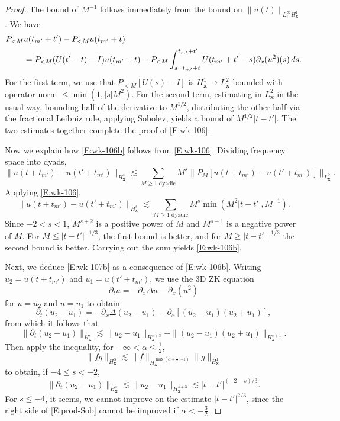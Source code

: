 \documentclass[12pt,letterpaper]{amsart}
\newcommand{\indentalign}{\hspace{0.3in}&\hspace{-0.3in}}
\theoremstyle{remark}
\numberwithin{equation}{section}
\numberwithin{theorem}{section}
\numberwithin{table}{section}
\begin{document}
\begin{proof}
The bound of $M^{-1}$ follows immediately from the bound on $\| u(t) \|_{L_t^\infty H_{\mathbf{x}}^1}$.
We have
\begin{align*}
\indentalign P_{<M} u(t_{m'}+t') - P_{<M}  u(t_{m'}+t) \\
&= P_{<M} (U(t'-t)-I) u(t_{m'}+t)  - P_{<M} \int_{s=t_{m'}+t}^{t_{m'}+t'} U(t_{m'}+t'-s) \partial_x (u^2)(s) \,ds.
\end{align*}
For the first term, we use that $P_{<M} [U(s)-I]$ is $H_{\mathbf{x}}^1 \to L_{\mathbf{x}}^2$ bounded with operator norm $\leq \min(1,|s|M^2)$.  
For the second term, estimating in $L^2_{\mathbf{x}}$ in the usual way, bounding half of the derivative to $M^{1/2}$, distributing the other half via the fractional Leibniz rule, applying Sobolev, yields a bound of $M^{1/2}|t-t'|$.  The two estimates together complete the proof of \eqref{E:wk-106}.  

Now we explain how \eqref{E:wk-106b} follows from \eqref{E:wk-106}.  Dividing frequency space into dyads,
$$
\| u( t+t_{m'}) -  u(t'+t_{m'}) \|_{H^s_{\mathbf{x}}} \lesssim \sum_{M\geq 1 \text{ dyadic}} M^s \| P_M [u( t+t_{m'}) -  u(t'+t_{m'})] \|_{L^2_{\mathbf{x}}}.
$$
Applying \eqref{E:wk-106},
$$
\| u( t+t_{m'}) -  u(t'+t_{m'}) \|_{H^s_{\mathbf{x}}} \lesssim \sum_{M\geq 1 \text{ dyadic}} M^s \min( M^2|t-t'|, M^{-1}).
$$
Since $-2<s<1$, $M^{s+2}$ is a positive power of $M$ and $M^{s-1}$ is a negative power of $M$.  For $M \leq |t-t'|^{-1/3}$, the first bound is better, and for $M\geq |t-t'|^{-1/3}$ the second bound is better.  Carrying out the sum yields \eqref{E:wk-106b}.  

Next, we deduce \eqref{E:wk-107b} as a consequence of \eqref{E:wk-106b}.  Writing $u_2 = u(t+t_{m'})$ and $u_1 = u(t'+t_{m'})$, we use the 3D ZK equation 
$$
\partial_t u = -\partial_x \Delta u - \partial_x(u^2)
$$
for $u=u_2$ and $u=u_1$ to obtain
$$
\partial_t (u_2-u_1) = - \partial_x\Delta(u_2-u_1) - \partial_x[ (u_2-u_1)(u_2+u_1) ],
$$
from which it follows that
$$
\| \partial_t (u_2-u_1) \|_{H_{\mathbf{x}}^s} \lesssim \|u_2 -u_1 \|_{H_{\mathbf{x}}^{s+3}} + \|(u_2-u_1)(u_2+u_1) \|_{H_{\mathbf{x}}^{s+1}}.
$$
Then apply the inequality, for $-\infty<\alpha\leq \frac12$,
\begin{equation}
\label{E:prod-Sob}
\| fg \|_{H_{\mathbf{x}}^\alpha} \lesssim  \|f \|_{H_{\mathbf{x}}^{\max(\alpha+\frac12,-1)}}  \|g \|_{H_{\mathbf{x}}^1}
\end{equation}
to obtain, if $-4\leq s< -2$,
$$
\| \partial_t (u_2-u_1) \|_{H_{\mathbf{x}}^s }\lesssim \|u_2 - u_1 \|_{H_{\mathbf{x}}^{s+3}} \lesssim |t-t'|^{(-2-s)/3}.
$$
For $s\leq -4$, it seems, we cannot improve on the estimate $|t-t'|^{2/3}$, since the right side of \eqref{E:prod-Sob} cannot be improved if $\alpha<-\frac32$.  
\end{proof}
\end{document}
